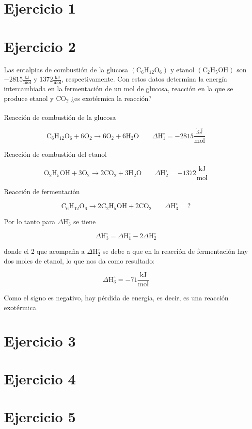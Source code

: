 \documentclass[12pt]{article}
\begin{document}
\section*{Ejercicio 1}

\section*{Ejercicio 2}
Las entalpias de combustión de la glucosa $(\mathrm{C}_6\mathrm{H}_{12}\mathrm{O}_6)$ y etanol $(\mathrm{C}_2\mathrm{H}_5\mathrm{OH})$ son $-2815\frac{\mathrm{kJ}}{\mathrm{mol}}$ y $1372 \frac{\mathrm{kJ}}{\mathrm{mol}}$, respectivamente. Con estos datos determina la energía intercambiada en la fermentación de un mol de glucosa, reacción en la que se produce etanol y $\mathrm{CO}_2$ ¿es exotérmica la reacción?\\
\\
Reacción de combustión de la glucosa

\begin{displaymath}
	\mathrm{C}_6\mathrm{H}_{12}\mathrm{O}_6+6\mathrm{O}_2 \rightarrow 6\mathrm{O}_2+6\mathrm{H}_2\mathrm{O} \;\;\;\;\;\;\; \Delta\mathrm{H}_1^{\circ}=-2815\frac{\mathrm{kJ}}{\mathrm{mol}}
\end{displaymath}

Reacción de combustión del etanol

\begin{displaymath}
	\mathrm{O}_2\mathrm{H}_5\mathrm{OH}+3\mathrm{O}_2 \rightarrow 2\mathrm{CO}_2+3\mathrm{H}_2\mathrm{O}\;\;\;\;\;\;\; \Delta\mathrm{H}_2^{\circ}=-1372\frac{\mathrm{kJ}}{\mathrm{mol}}
\end{displaymath}

Reacción de fermentación

\begin{displaymath}
		\mathrm{C}_6\mathrm{H}_{12}\mathrm{O}_6 \rightarrow 2\mathrm{C}_2\mathrm{H}_5\mathrm{OH} + 2\mathrm{CO}_2 \;\;\;\;\;\;\; \Delta\mathrm{H}_3^{\circ}= ?
\end{displaymath}

Por lo tanto para $\Delta\mathrm{H}_3^{\circ}$ se tiene

\begin{displaymath}
	\Delta\mathrm{H}_3^{\circ}=\Delta\mathrm{H}_1^{\circ}-2\Delta\mathrm{H}_2^{\circ}
\end{displaymath}

donde el 2 que acompaña a $\Delta\mathrm{H}_2^{\circ}$ se debe a que en la reacción de fermentación hay dos moles de etanol, lo que nos da como resultado:

\begin{displaymath}
	\Delta\mathrm{H}_3^{\circ}=-71\frac{\mathrm{kJ}}{\mathrm{mol}}
\end{displaymath}

Como el signo es negativo, hay pérdida de energía, es decir, es una reacción exotérmica
\section*{Ejercicio 3}

\section*{Ejercicio 4}

\section*{Ejercicio 5}
\end{document}
